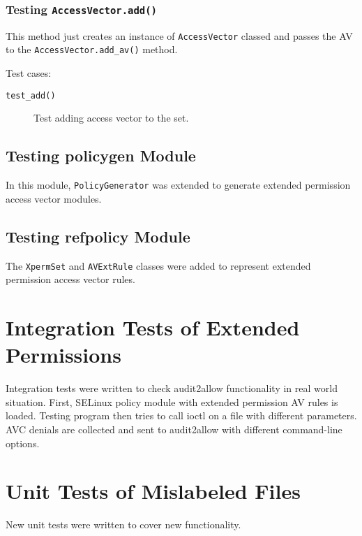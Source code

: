 \subsubsection{Testing \texttt{AccessVector.add()}}
This method just creates an instance of \texttt{AccessVector} classed and passes
the AV to the \texttt{AccessVector.add\_av()} method.

Test cases:
\begin{description}
    \item [\texttt{test\_add()}] Test adding access vector to the set.
\end{description}

\subsection{Testing policygen Module}

In this module, \texttt{PolicyGenerator} was extended to generate extended
permission access vector modules.

\subsection{Testing refpolicy Module}

The \texttt{XpermSet} and \texttt{AVExtRule} classes were added to represent
extended permission access vector rules.

\section{Integration Tests of Extended Permissions}

Integration tests were written to check audit2allow functionality in real world
situation. First, SELinux policy module with extended permission AV rules is
loaded. Testing program then tries to call ioctl on a file with different
parameters. AVC denials are collected and sent to audit2allow with different
command-line options.

\section{Unit Tests of Mislabeled Files}

New unit tests were written to cover new functionality.

